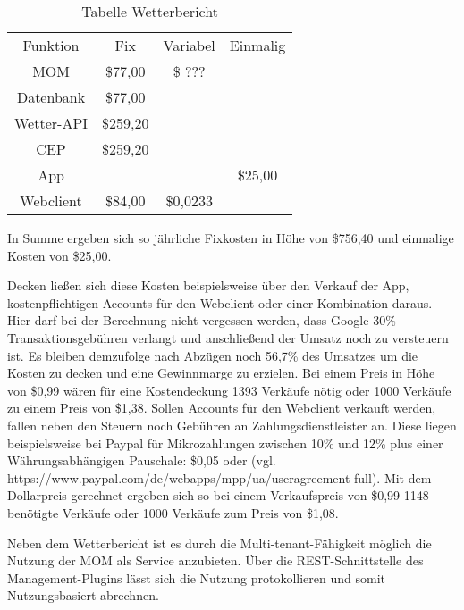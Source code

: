 \begin{table}
\caption{Tabelle Wetterbericht}
\centering
\begin{tabular}{cccc}
	Funktion 	& Fix		& Variabel	& Einmalig \\
	MOM 		& \$77,00	& \$ ??? 	& \\
	Datenbank	& \$77,00	&			& \\
	Wetter-API 	& \$259,20	&	 		& \\
	CEP 		& \$259,20	& 			& \\
	App			&			&			& \$25,00 \\
	Webclient	& \$84,00	& \$0,0233	& \\
\end{tabular}
\end{table}

In Summe ergeben sich so jährliche Fixkosten in Höhe von \$756,40 und einmalige Kosten von \$25,00.

Decken ließen sich diese Kosten beispielsweise über den Verkauf der App, kostenpflichtigen Accounts für den Webclient oder einer Kombination daraus. Hier darf bei der Berechnung nicht vergessen werden, dass Google 30\% Transaktionsgebühren verlangt und anschließend der Umsatz noch zu versteuern ist. Es bleiben demzufolge nach Abzügen noch 56,7\% des Umsatzes um die Kosten zu decken und eine Gewinnmarge zu erzielen. Bei einem Preis in Höhe von \$0,99 wären für eine Kostendeckung 1393 Verkäufe nötig oder 1000 Verkäufe zu einem Preis von \$1,38. Sollen Accounts für den Webclient verkauft werden, fallen neben den Steuern noch Gebühren an Zahlungsdienstleister an. Diese liegen beispielsweise bei Paypal für Mikrozahlungen zwischen 10\% und 12\% plus einer Währungsabhängigen Pauschale: \$0,05 oder  (vgl. https://www.paypal.com/de/webapps/mpp/ua/useragreement-full). Mit dem Dollarpreis gerechnet ergeben sich so bei einem Verkaufspreis von \$0,99 1148 benötigte Verkäufe oder 1000 Verkäufe zum Preis von \$1,08.

Neben dem Wetterbericht ist es durch die Multi-tenant-Fähigkeit möglich die Nutzung der MOM als Service anzubieten. Über die REST-Schnittstelle des Management-Plugins lässt sich die Nutzung protokollieren und somit Nutzungsbasiert abrechnen.